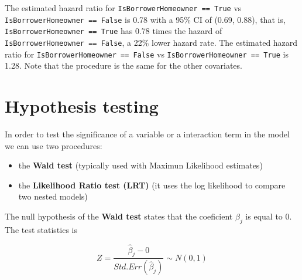 \documentclass[]{book}
\makeatletter
\newenvironment{Shaded}{\begin{snugshade}}{\end{snugshade}}
\newcommand{\KeywordTok}[1]{\textcolor[rgb]{0.13,0.29,0.53}{\textbf{#1}}}
\newcommand{\DataTypeTok}[1]{\textcolor[rgb]{0.13,0.29,0.53}{#1}}
\newcommand{\DecValTok}[1]{\textcolor[rgb]{0.00,0.00,0.81}{#1}}
\newcommand{\StringTok}[1]{\textcolor[rgb]{0.31,0.60,0.02}{#1}}
\newcommand{\CommentTok}[1]{\textcolor[rgb]{0.56,0.35,0.01}{\textit{#1}}}
\newcommand{\OtherTok}[1]{\textcolor[rgb]{0.56,0.35,0.01}{#1}}
\newcommand{\OperatorTok}[1]{\textcolor[rgb]{0.81,0.36,0.00}{\textbf{#1}}}
\newcommand{\NormalTok}[1]{#1}
\newenvironment{kframe}{%
\medskip{}
\setlength{\fboxsep}{.8em}
 \def\at@end@of@kframe{}%
 \ifinner\ifhmode%
  \def\at@end@of@kframe{\end{minipage}}%
  \begin{minipage}{\columnwidth}%
 \fi\fi%
 \def\FrameCommand##1{\hskip\@totalleftmargin \hskip-\fboxsep
 \colorbox{shadecolor}{##1}\hskip-\fboxsep
     \hskip-\linewidth \hskip-\@totalleftmargin \hskip\columnwidth}%
 \MakeFramed {\advance\hsize-\width
   \@totalleftmargin\z@ \linewidth\hsize
   \@setminipage}}%
 {\par\unskip\endMakeFramed%
 \at@end@of@kframe}
\renewenvironment{Shaded}{\begin{kframe}}{\end{kframe}}
\theoremstyle{definition}
\theoremstyle{definition}
\theoremstyle{definition}
\theoremstyle{remark}
\makeatother
\begin{document}
The estimated hazard ratio for \texttt{IsBorrowerHomeowner\ ==\ True} vs
\texttt{IsBorrowerHomeowner\ ==\ False} is 0.78 with a 95\% CI of (0.69,
0.88), that is, \texttt{IsBorrowerHomeowner\ ==\ True} has 0.78 times
the hazard of \texttt{IsBorrowerHomeowner\ ==\ False}, a 22\% lower
hazard rate. The estimated hazard ratio for
\texttt{IsBorrowerHomeowner\ ==\ False} vs
\texttt{IsBorrowerHomeowner\ ==\ True} is 1.28. Note that the procedure
is the same for the other covariates.

\section{Hypothesis testing}\label{hypothesis-testing}

In order to test the significance of a variable or a interaction term in
the model we can use two procedures:

\begin{itemize}
\item
  the \textbf{Wald test} (typically used with Maximun Likelihood
  estimates)
\item
  the \textbf{Likelihood Ratio test (LRT)} (it uses the log likelihood
  to compare two nested models)
\end{itemize}

The null hypothesis of the \textbf{Wald test} states that the coeficient
\(\beta_j\) is equal to 0. The test statistics is

\[
Z = \frac{\hat \beta_j - 0}{Std. Err (\hat \beta_j)} \sim N(0,1)
\]

\begin{Shaded}
\end{Shaded}
\end{document}
